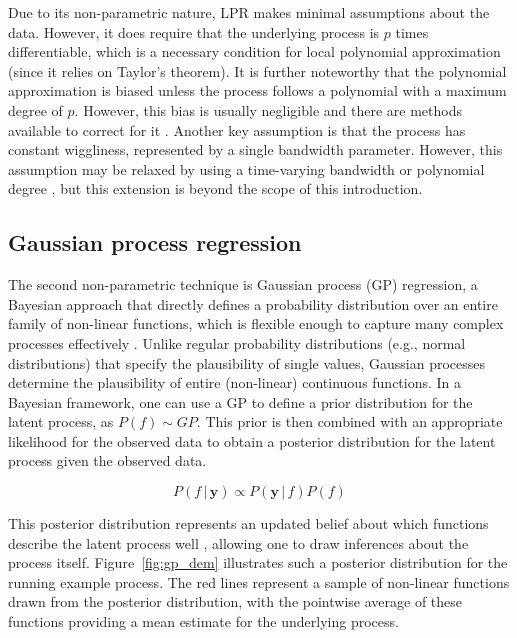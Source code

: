 \documentclass[jou, floatsintext]{apa7}
\begin{document}
Due to its non-parametric nature, LPR makes minimal assumptions about the data.
However, it does require that the underlying process is $p$ times
differentiable, which is a necessary condition for local polynomial
approximation (since it relies on Taylor's theorem). It is further noteworthy
that the polynomial approximation is biased unless the process follows a
polynomial with a maximum degree of $p$. However, this bias is usually
negligible and there are methods available to correct for it
\parencite{R-nprobust}. Another key assumption is that the process has constant
wiggliness, represented by a single bandwidth parameter. However, this
assumption may be relaxed by using a time-varying bandwidth
\parencite{fan_data-driven_1995} or polynomial degree
\parencite{fan_adaptive_1995}, but this extension is beyond the scope of this
introduction.

\subsection{Gaussian process regression}

The second non-parametric technique is Gaussian process (GP) regression, a
Bayesian approach that directly defines a probability distribution over an
entire family of non-linear functions, which is flexible enough to capture many
complex processes effectively \parencite{rasmussen_gaussian_2006,
  betancourt_robust_2020, roberts_gaussian_2013}. Unlike regular probability
distributions (e.g., normal distributions) that specify the plausibility of
single values, Gaussian processes determine the plausibility of entire
(non-linear) continuous functions. In a Bayesian framework, one can use a GP to
define a prior distribution for the latent process, as $P(f) \sim GP$. This
prior is then combined with an appropriate likelihood for the observed data to
obtain a posterior distribution for the latent process given the observed data.

\begin{equation}
  P(f \, | \, \textbf{y})  \propto P(\textbf{y} \, | \, f) P(f)
\end{equation}

\noindent This posterior distribution represents an updated belief about which
functions describe the latent process well \parencite{kruschke_doing_2011},
allowing one to draw inferences about the process itself.
Figure~\ref{fig:gp_dem} illustrates such a posterior distribution for the
running example process. The red lines represent a sample of non-linear
functions drawn from the posterior distribution, with the pointwise average of
these functions providing a mean estimate for the underlying process.
\end{document}
